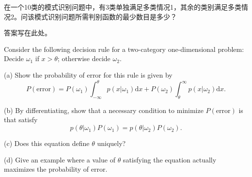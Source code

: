 \documentclass{hw}
\begin{document}
	

\maketitle

\makeproblem

\begin{problem*}[无标号问题]
在一个10类的模式识别问题中，有3类单独满足多类情况1，其余的类别满足多类情况2。问该模式识别问题所需判别函数的最少数目是多少？
\end{problem*}

\begin{answer*}
答案写在此处。
\end{answer*}

\begin{problem}

Consider the following decision rule for a two-category one-dimensional problem: 
Decide \(\omega_1\) if \(x > \theta\); otherwise decide \(\omega_2\).

(a) Show the probability of error for this rule is given by
\[
P(\text{error}) = P\left(\omega_{1}\right) \int_{-\infty}^{\theta} p\left(x | \omega_{1}\right) \mathrm{d}x+P\left(\omega_{2}\right) \int_{\theta}^{\infty} p\left(x | \omega_{2}\right) \mathrm{d}x.
\]

(b) By differentiating, show that a necessary condition to minimize \(P(\text{error})\) is that satisfy
\[
p(\theta | \omega_1) P(\omega_1) = p(\theta | \omega_2) P(\omega_2).
\]

(c) Does this equation define \(\theta\) uniquely?

(d) Give an example where a value of \(\theta\) satisfying the equation actually maximizes the probability of error.

\end{problem}
\end{document}
